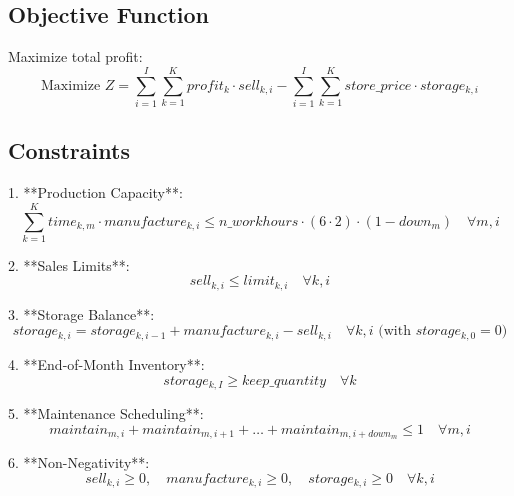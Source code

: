 \documentclass{article}
\begin{document}
\subsection*{Objective Function}
Maximize total profit:
\[
\text{Maximize } Z = \sum_{i=1}^{I} \sum_{k=1}^{K} profit_k \cdot sell_{k,i} - \sum_{i=1}^{I} \sum_{k=1}^{K} store\_price \cdot storage_{k,i}
\]

\subsection*{Constraints}
1. **Production Capacity**:
\[
\sum_{k=1}^{K} time_{k,m} \cdot manufacture_{k,i} \leq n\_workhours \cdot (6 \cdot 2) \cdot (1 - down_m) \quad \forall m, i
\]

2. **Sales Limits**:
\[
sell_{k,i} \leq limit_{k,i} \quad \forall k, i
\]

3. **Storage Balance**:
\[
storage_{k,i} = storage_{k,i-1} + manufacture_{k,i} - sell_{k,i} \quad \forall k, i \text{ (with } storage_{k,0} = 0 \text{)}
\]

4. **End-of-Month Inventory**:
\[
storage_{k,I} \geq keep\_quantity \quad \forall k
\]

5. **Maintenance Scheduling**:
\[
maintain_{m,i} + maintain_{m,i+1} + \ldots + maintain_{m,i+down_m} \leq 1 \quad \forall m, i
\]

6. **Non-Negativity**:
\[
sell_{k,i} \geq 0, \quad manufacture_{k,i} \geq 0, \quad storage_{k,i} \geq 0 \quad \forall k, i
\]
\end{document}

